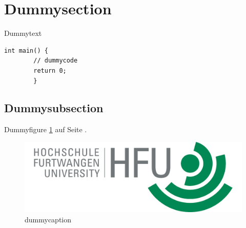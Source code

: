 \documentclass[11pt,a4paper]{article}
\begin{document}
\lstset{language=C}


\clearpage
\setcounter{page}{1}
\tableofcontents

\section{Dummysection}
\setcounter{page}{1}
Dummytext
\begin{lstlisting}[frame=single]
int main() {
        // dummycode
        return 0;
        }
\end{lstlisting}
\subsection{Dummysubsection}
Dummyfigure \ref{hfu} auf Seite \pageref{hfu}.

\begin{figure}[h!]
  \caption{dummycaption}
  \label{hfu}
  \centering
    \includegraphics[scale=1]{hfu.png}
\end{figure}
\end{document}
